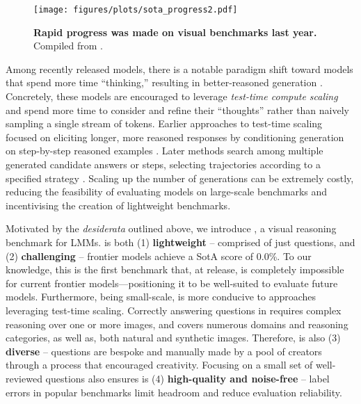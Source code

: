 \begin{figure}[t]
        \centering
        \texttt{[image: figures/plots/sota\_progress2.pdf]}
        \vspace{-1cm} %
        \caption{\textbf{Rapid progress was made on visual benchmarks last year.} Compiled from \cite{2023opencompass}.}
        \label{fig:benchmark_timelines}
\end{figure}

Among recently released models, there is a notable paradigm shift toward models that spend more time ``thinking,'' resulting in better-reasoned generation \cite{o1_reasoning}. Concretely, these models are encouraged to leverage \textit{test-time compute scaling} \citep{jones2021scaling,snell2024scaling} and spend more time to consider and refine their ``thoughts'' rather than naively sampling a single stream of tokens. Earlier approaches to test-time scaling focused on eliciting longer, more reasoned responses by conditioning generation on step-by-step reasoned examples \cite{wei2022chain}. Later methods search among multiple generated candidate answers or steps, selecting trajectories according to a specified strategy \cite{hf_ttcompute}. Scaling up the number of generations %
can be extremely costly, reducing the feasibility of evaluating models on large-scale benchmarks and incentivising the creation of lightweight benchmarks. 

Motivated by the \textit{desiderata} outlined above, we introduce \benchmarkName, a visual reasoning benchmark for LMMs. \benchmarkName is both (1) \textbf{lightweight} -- comprised of just \nquestions questions, and (2) \textbf{challenging} -- frontier models achieve a SotA score of 0.0\%. To our knowledge, this is the first benchmark that, at release, is completely impossible for current frontier models---positioning it to be well-suited to evaluate future models. Furthermore, being small-scale, \benchmarkName is more conducive to approaches leveraging test-time scaling. Correctly answering questions in \benchmarkName requires complex reasoning over one or more images, and covers numerous domains and reasoning categories, as well as, both natural and synthetic images. Therefore, \benchmarkName is also (3) \textbf{diverse} -- questions are bespoke and manually made by a pool of creators through a process that encouraged creativity. Focusing on a small set of well-reviewed questions also ensures \benchmarkName is (4) \textbf{high-quality and noise-free} -- label errors in popular benchmarks \cite{northcutt2021pervasive} limit headroom and reduce evaluation reliability.



